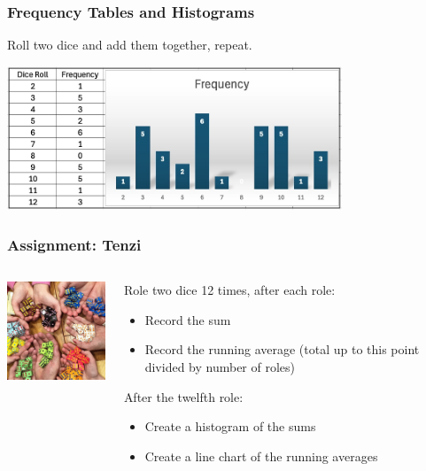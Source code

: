 \documentclass{beamer}
\begin{document}
\begin{frame}\frametitle{Frequency Tables and Histograms}

\begin{center}

Roll two dice and add them together, repeat. \newline

\includegraphics[width=10cm]{fig/stat1.jpg}
\end{center}

\end{frame}

\begin{frame}\frametitle{Assignment: Tenzi}
\begin{columns}
\begin{column}{4cm}
\begin{center}
\includegraphics[width=4cm]{fig/dice.jpg}
\end{center}
\end{column}
\begin{column}{7cm}

Role two dice 12 times, after each role:
\begin{itemize}
\item Record the sum
\item Record the running average (total up to this point divided by number of roles)
\end{itemize}
After the twelfth role:
\begin{itemize}
\item Create a histogram of the sums
\item Create a line chart of the running averages
\end{itemize}
\end{column}
\end{columns}
\end{frame}
\end{document}
